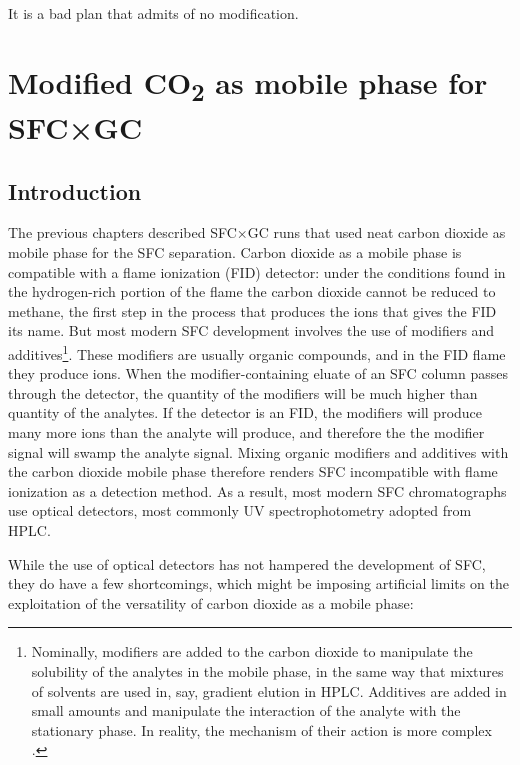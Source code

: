 
\begin{savequote}[\quotewidth]
It is a bad plan that admits of no modification.
\end{savequote}

\chapter{Modified CO\textsubscript{2} as mobile phase for SFC×GC} %
\label{Chapter8}

\section{Introduction}

The previous chapters described SFC×GC runs that used neat carbon dioxide as
mobile phase for the SFC separation. Carbon dioxide as a mobile phase is
compatible with a flame ionization (FID) detector: under the conditions found in
the hydrogen-rich portion of the flame the carbon dioxide cannot be reduced to
methane, the first step in the process that produces the ions that gives the FID
its name. But most modern SFC development involves the use of modifiers and
additives\footnote{Nominally, modifiers are added to the carbon dioxide to
manipulate the solubility of the analytes in the mobile phase, in the same way
that mixtures of solvents are used in, say, gradient elution in HPLC. Additives
are added in small amounts and manipulate the interaction of the analyte with
the stationary phase. In reality, the mechanism of their action is more complex
\autocite{Berger1991}.}. These modifiers are usually organic compounds, and in
the FID flame they produce ions. When the modifier-containing eluate of an SFC
column passes through the detector, the quantity of the modifiers will be much
higher than quantity of the analytes. If the detector is an FID, the modifiers
will produce many more ions than the analyte will produce, and therefore the the
modifier signal will swamp the analyte signal. Mixing organic modifiers and
additives with the carbon dioxide mobile phase therefore renders SFC
incompatible with flame ionization as a detection method. As a result, most
modern SFC chromatographs use optical detectors, most commonly UV
spectrophotometry adopted from HPLC.

While the use of optical detectors has not hampered the development of SFC,
they do have a few shortcomings, which might be imposing artificial limits on
the exploitation of the versatility of carbon dioxide as a mobile phase:

